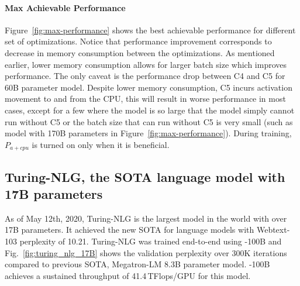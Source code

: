 \paragraph{Max Achievable Performance}
Figure~\ref{fig:max-performance} shows the best achievable performance for different set of optimizations. Notice that performance improvement corresponds to decrease in memory consumption between the optimizations. As mentioned earlier, lower memory consumption allows for larger batch size which improves performance. The only caveat is the performance drop between C4 and C5 for 60B parameter model. Despite lower memory consumption, C5 incurs activation movement to and from the CPU, this will result in worse performance in most cases, except for a few where the model is so large that the model simply cannot run without C5 or the batch size that can run without C5 is very small (such as model with 170B parameters in Figure~\ref{fig:max-performance}). During training, $P_{a+cpu}$ is turned on only when it is beneficial.
\subsection{Turing-NLG, the SOTA language model with 17B parameters}
As of May 12th, 2020, Turing-NLG is the largest model in the world with over 17B parameters. It achieved the new SOTA for language models with Webtext-103 perplexity of 10.21. Turing-NLG was trained end-to-end using \name-100B and Fig.~\ref{fig:turing_nlg_17B} shows the validation perplexity over 300K iterations compared to previous SOTA, Megatron-LM 8.3B parameter model. \name-100B achieves a sustained throughput of 41.4\,TFlops/GPU for this model.

